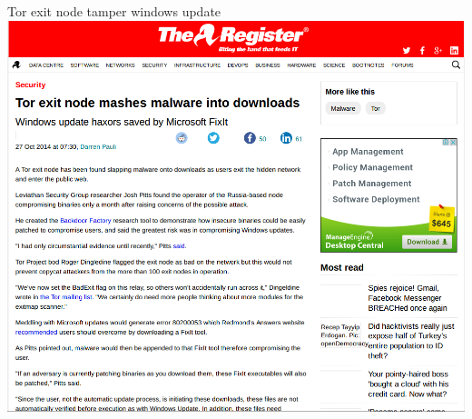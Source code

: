\documentclass[11pt]{beamer}
\begin{document}
\begin{frame}{Tor exit node tamper windows update}
\includegraphics[scale=0.3]{tor_exit_windows_update.png}
\end{frame}
\end{document}
